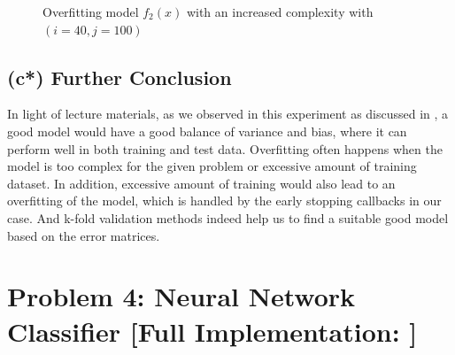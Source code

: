 \documentclass{tron}
\begin{document}
\begin{figure}[H]
	\centering
	\caption{Overfitting model $f_2(x)$ with an increased complexity with $(i=40, j=100)$\label{fig:p3:2:fit:2:over:comp}}
\end{figure}

\subsection{(c*) Further Conclusion}
In light of lecture materials, as we observed in this experiment as discussed in , a good model would have a good balance of variance and bias, where it can perform well in both training and test data. Overfitting often happens when the model is too complex for the given problem or excessive amount of training dataset. In addition, excessive amount of training would also lead to an overfitting of the model, which is handled by the early stopping callbacks in our case. And k-fold validation methods indeed help us to find a suitable good model based on the error matrices.


\newpage
\section{Problem 4: Neural Network Classifier [Full Implementation: ]}
\end{document}
